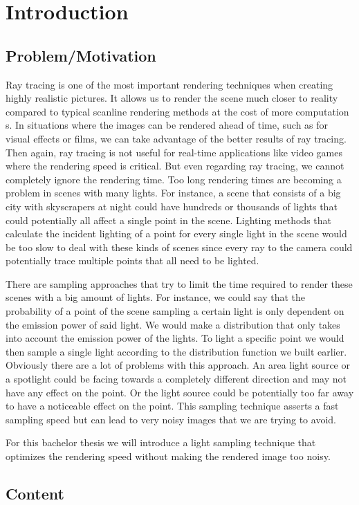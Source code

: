 
\chapter{Introduction}
\label{ch:Introduction}

\section{Problem/Motivation}
\label{sec:Introduction:Motivation}

Ray tracing is one of the most important rendering techniques when creating highly realistic pictures. It allows us to render the scene much closer to reality compared to typical scanline rendering methods at the cost of more computation s. In situations where the images can be rendered ahead of time, such as for visual effects or films, we can take advantage of the better results of ray tracing. Then again, ray tracing is not useful for real-time applications like video games where the rendering speed is critical. But even regarding ray tracing, we cannot completely ignore the rendering time. Too long rendering times are becoming a problem in scenes with many lights. For instance, a scene that consists of a big city with skyscrapers at night could have hundreds or thousands of lights that could potentially all affect a single point in the scene. Lighting methods that calculate the incident lighting of a point for every single light in the scene would be too slow to deal with these kinds of scenes since every ray to the camera could potentially trace multiple points that all need to be lighted.

There are sampling approaches that try to limit the time required to render these scenes with a big amount of lights. For instance, we could say that the probability of a point of the scene sampling a certain light is only dependent on the emission power of said light. We would make a distribution that only takes into account the emission power of the lights. To light a specific point we would then sample a single light according to the distribution function we built earlier. Obviously there are a lot of problems with this approach. An area light source or a spotlight could be facing towards a completely different direction and may not have any effect on the point. Or the light source could be potentially too far away to have a noticeable effect on the point. This sampling technique asserts a fast sampling speed but can lead to very noisy images that we are trying to avoid.

For this bachelor thesis we will introduce a light sampling technique that optimizes the rendering speed without making the rendered image too noisy.

\section{Content}
\label{sec:Introduction:Content}
